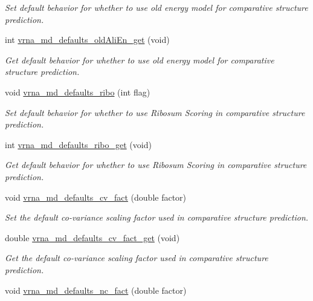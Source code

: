 \begin{DoxyCompactItemize}
\begin{DoxyCompactList}\small\item\em Set default behavior for whether to use old energy model for comparative structure prediction. \end{DoxyCompactList}\item 
int \hyperlink{group__model__details_ga2374492b5019df88022fe4c05f0f3630}{vrna\+\_\+md\+\_\+defaults\+\_\+old\+Ali\+En\+\_\+get} (void)
\begin{DoxyCompactList}\small\item\em Get default behavior for whether to use old energy model for comparative structure prediction. \end{DoxyCompactList}\item 
void \hyperlink{group__model__details_ga937c45e1d06fd6168730a9b08d130be3}{vrna\+\_\+md\+\_\+defaults\+\_\+ribo} (int flag)
\begin{DoxyCompactList}\small\item\em Set default behavior for whether to use Ribosum Scoring in comparative structure prediction. \end{DoxyCompactList}\item 
int \hyperlink{group__model__details_ga169027f0c0561ea7d87b655e4b336bfc}{vrna\+\_\+md\+\_\+defaults\+\_\+ribo\+\_\+get} (void)
\begin{DoxyCompactList}\small\item\em Get default behavior for whether to use Ribosum Scoring in comparative structure prediction. \end{DoxyCompactList}\item 
void \hyperlink{group__model__details_gad3a3f40baafd91a6ce80a91a68e20053}{vrna\+\_\+md\+\_\+defaults\+\_\+cv\+\_\+fact} (double factor)
\begin{DoxyCompactList}\small\item\em Set the default co-\/variance scaling factor used in comparative structure prediction. \end{DoxyCompactList}\item 
double \hyperlink{group__model__details_gae59c68393807217b0a2497adb64d3ee3}{vrna\+\_\+md\+\_\+defaults\+\_\+cv\+\_\+fact\+\_\+get} (void)
\begin{DoxyCompactList}\small\item\em Get the default co-\/variance scaling factor used in comparative structure prediction. \end{DoxyCompactList}\item 
void \hyperlink{group__model__details_gac35e596c850dce3ad55c49119fd7d471}{vrna\+\_\+md\+\_\+defaults\+\_\+nc\+\_\+fact} (double factor)

\end{DoxyCompactItemize}
